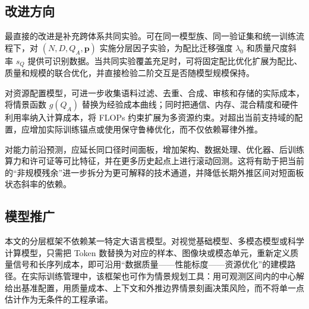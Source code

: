\subsection{改进方向}

最直接的改进是补充跨体系共同实验。可在同一模型族、同一验证集和统一训练流程下，对 $(N,D,Q_A,\boldsymbol p)$ 实施分层因子实验，为配比迁移强度 $\lambda_0$ 和质量尺度斜率 $s_Q$ 提供可识别数据。当共同实验覆盖充足时，可将固定配比优化扩展为配比、质量和规模的联合优化，并直接检验二阶交互是否随模型规模保持。

对资源配置模型，可进一步收集语料过滤、去重、合成、审核和存储的实际成本，将情景函数 $g(Q_A)$ 替换为经验成本曲线；同时把通信、内存、混合精度和硬件利用率纳入计算成本，将 FLOPs 约束扩展为多资源约束。对超出当前支持域的配置，应增加实际训练锚点或使用保守鲁棒优化，而不仅依赖幂律外推。

对能力前沿预测，应延长同口径时间面板，增加架构、数据处理、优化器、后训练算力和许可证等可比特征，并在更多历史起点上进行滚动回测。这将有助于把当前的“非规模残余”进一步拆分为更可解释的技术通道，并降低长期外推区间对短面板状态斜率的依赖。

\subsection{模型推广}

本文的分层框架不依赖某一特定大语言模型。对视觉基础模型、多模态模型或科学计算模型，只需把 Token 数替换为对应的样本、图像块或模态单元，重新定义质量信号和长序列成本，即可沿用“数据质量——性能标度——资源优化”的建模路径。在实际训练管理中，该框架也可作为情景规划工具：用可观测区间内的中心解给出基准配置，用质量成本、上下文和外推边界情景刻画决策风险，而不将单一点估计作为无条件的工程承诺。




